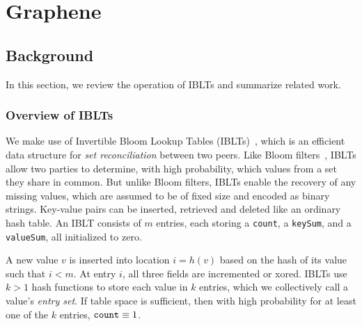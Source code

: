 \chapter{Graphene}
\label{graphene}

\section{Background}
In this section, we review the operation of IBLTs and summarize related work.

\subsection{Overview of IBLTs}
\label{sec:iblts-explained}\label{sec:network-rate}
We make use of Invertible Bloom Lookup Tables (IBLTs)~\cite{goodrich:2011}, which is an efficient data structure  for {\em set reconciliation} between two peers.  Like 
  Bloom filters~\cite{Bloom:1970}, IBLTs allow
  two parties to determine, with high probability, which values from a
  set they share in common.  But unlike Bloom filters, IBLTs enable the
  recovery of any missing values, which are assumed to be of fixed
  size and encoded as binary strings.  Key-value pairs can be
  inserted, retrieved and deleted like an ordinary hash table.  An
  IBLT consists of $m$ entries, each storing a \texttt{count}, a
  \texttt{keySum}, and a \texttt{valueSum}, all initialized to zero. 
  
  A new value $v$ is inserted into location $i=h(v)$ based on
the hash of its value such that $i < m$.  At entry $i$, all three
fields are incremented or xored.  
  IBLTs use $k > 1$ hash
functions to store each value in $k$ entries, which we collectively call a value's \emph{entry set}.  
If table space is sufficient, then with high probability for at least one of the $k$
entries, $\mbox{\texttt{count}} \equiv 1$.

